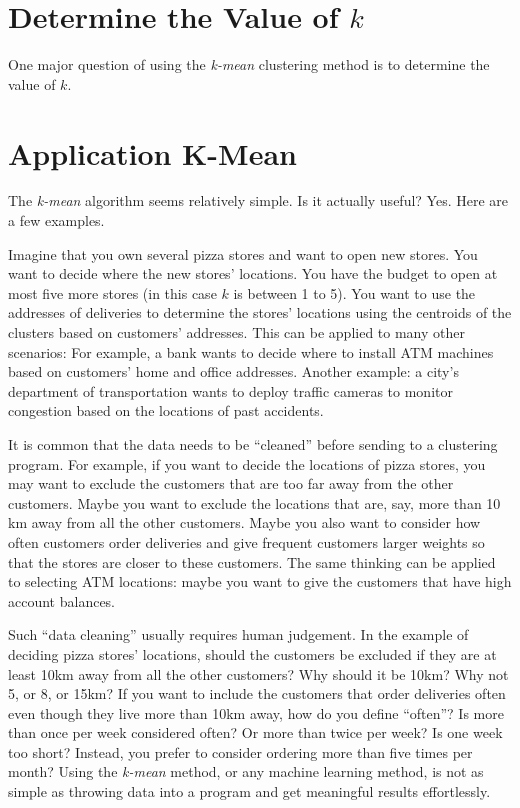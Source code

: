 
\section{Determine the Value of $k$}

One major question of using the {\it k-mean} clustering method is to
determine the value of $k$.


\section{Application K-Mean}

The {\it k-mean} algorithm seems relatively simple. Is it actually useful?
Yes. Here are a few examples.

Imagine that you own several pizza stores and want to open new stores.
You want to decide where the new stores' locations.  You have the
budget to open at most five more stores (in this case $k$ is between 1
to 5).  You want to use the addresses of deliveries to determine the
stores' locations using the centroids of the clusters based on
customers' addresses.  This can be applied to many other scenarios:
For example, a bank wants to decide where to install ATM machines
based on customers' home and office addresses.  Another example: a
city's department of transportation wants to deploy traffic cameras to
monitor congestion based on the locations of past accidents.


It is common that the data needs to be ``cleaned'' before sending to a
clustering program.  For example, if you want to decide the locations
of pizza stores, you may want to exclude the customers that are too
far away from the other customers. Maybe you want to exclude the
locations that are, say, more than 10 km away from all the other
customers.  Maybe you also want to consider how often customers order
deliveries and give frequent customers larger weights so that the
stores are closer to these customers.  The same thinking can be
applied to selecting ATM locations: maybe you want to give the
customers that have high account balances.


Such ``data cleaning'' usually requires human judgement. In the
example of deciding pizza stores' locations, should the customers be
excluded if they are at least 10km away from all the other customers?
Why should it be 10km? Why not 5, or 8, or 15km?  If you want to
include the customers that order deliveries often even though they
live more than 10km away, how do you define ``often''?  Is more than
once per week considered often? Or more than twice per week?  Is one
week too short? Instead, you prefer to consider ordering more than
five times per month?  Using the {\it k-mean} method, or any machine
learning method, is not as simple as throwing data into a program and
get meaningful results effortlessly.


